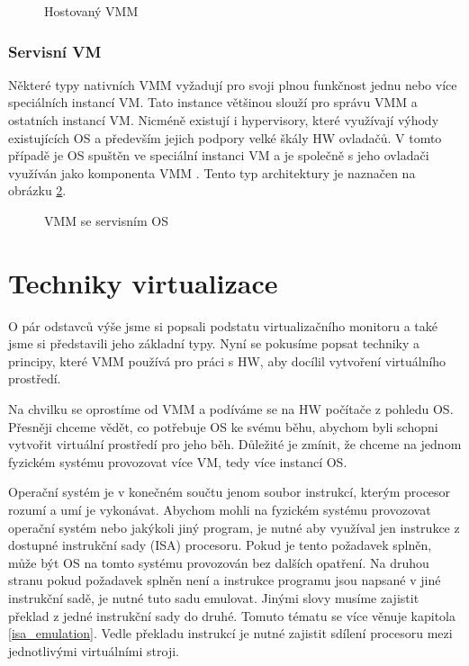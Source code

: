 \begin{figure}
    \centering    
    \caption{Hostovaný VMM}
    \label{hosted_vmm}
\end{figure}

\subsubsection*{Servisní VM}

Některé typy nativních VMM vyžadují pro svoji plnou funkčnost jednu nebo více speciálních instancí VM. Tato instance většinou slouží pro správu VMM a ostatních instancí VM. Nicméně existují i hypervisory, které využívají výhody
existujících OS a především jejich podpory velké škály HW ovladačů. V tomto případě je OS spuštěn ve speciální instanci VM a je společně s jeho ovladači využíván jako komponenta VMM \cite{vmm1}. Tento typ architektury je 
naznačen na obrázku \ref{servise_vmm}.

\begin{figure}
    \centering    
    \caption{VMM se servisním OS}
    \label{servise_vmm}
\end{figure}

\section{Techniky virtualizace}
\label{virt_techniques}

O pár odstavců výše jsme si popsali podstatu virtualizačního monitoru a také jsme si představili jeho základní typy. Nyní se pokusíme popsat techniky a principy, které VMM používá pro práci s HW, aby docílil vytvoření virtuálního prostředí.  

Na chvilku se oprostíme od VMM a podíváme se na HW počítače z pohledu OS. Přesněji chceme vědět, co potřebuje OS ke svému běhu, abychom byli schopni vytvořit virtuální prostředí pro jeho běh. Důležité je zmínit, že chceme na jednom
fyzickém systému provozovat více VM, tedy více instancí OS.

Operační systém je v konečném součtu jenom soubor instrukcí, kterým procesor rozumí a umí je vykonávat. Abychom mohli na fyzickém systému provozovat operační systém nebo jakýkoli jiný program, je nutné aby využíval jen instrukce z
dostupné instrukční sady (ISA) procesoru. Pokud je tento požadavek splněn, může být OS na tomto systému provozován bez dalších opatření. Na druhou stranu pokud požadavek splněn není a instrukce programu jsou napsané v jiné instrukční sadě, 
je nutné tuto sadu emulovat. Jinými slovy musíme zajistit překlad z jedné instrukční sady do druhé. Tomuto tématu se více věnuje kapitola \ref{isa_emulation}. Vedle překladu instrukcí je nutné zajistit sdílení procesoru mezi jednotlivými
virtuálními stroji.

